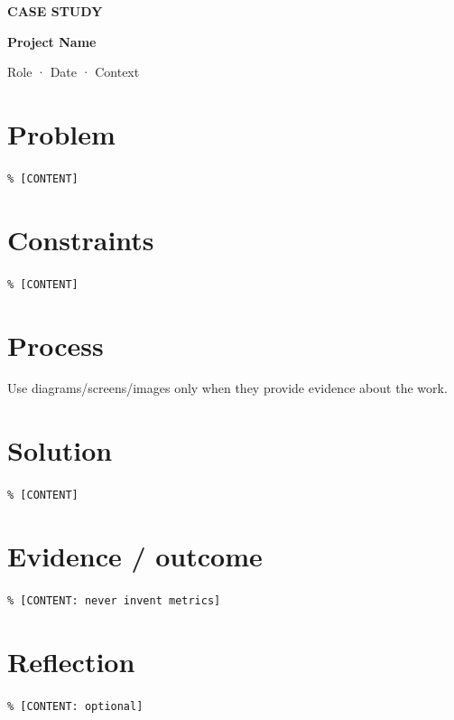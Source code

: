 \documentclass[11pt,a4paper]{scrartcl}
\begin{document}
{\small\sffamily\bfseries\color{Accent} CASE STUDY\par}{\Huge\bfseries Project Name\par}{\color{Muted} Role · Date · Context\par}
\section*{Problem}\texttt{\% [CONTENT]}
\section*{Constraints}\texttt{\% [CONTENT]}
\section*{Process}Use diagrams/screens/images only when they provide evidence about the work.
\section*{Solution}\texttt{\% [CONTENT]}
\section*{Evidence / outcome}\texttt{\% [CONTENT: never invent metrics]}
\section*{Reflection}\texttt{\% [CONTENT: optional]}
\end{document}
